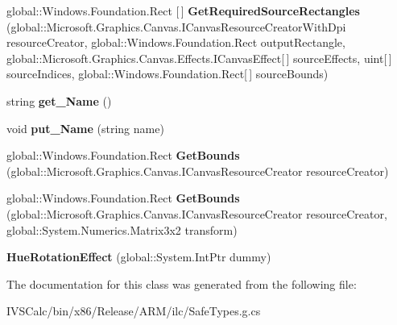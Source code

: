 \begin{DoxyCompactItemize}
\mbox{\label{class_microsoft_1_1_graphics_1_1_canvas_1_1_effects_1_1_hue_rotation_effect_ac2abf523127ccd95b9d02d46f71f9683}} 
global\+::\+Windows.\+Foundation.\+Rect \mbox{[}$\,$\mbox{]} {\bfseries Get\+Required\+Source\+Rectangles} (global\+::\+Microsoft.\+Graphics.\+Canvas.\+I\+Canvas\+Resource\+Creator\+With\+Dpi resource\+Creator, global\+::\+Windows.\+Foundation.\+Rect output\+Rectangle, global\+::\+Microsoft.\+Graphics.\+Canvas.\+Effects.\+I\+Canvas\+Effect\mbox{[}$\,$\mbox{]} source\+Effects, uint\mbox{[}$\,$\mbox{]} source\+Indices, global\+::\+Windows.\+Foundation.\+Rect\mbox{[}$\,$\mbox{]} source\+Bounds)
\item 
\mbox{\label{class_microsoft_1_1_graphics_1_1_canvas_1_1_effects_1_1_hue_rotation_effect_acc187d6e5e147dfe95acbc376249fd19}} 
string {\bfseries get\+\_\+\+Name} ()
\item 
\mbox{\label{class_microsoft_1_1_graphics_1_1_canvas_1_1_effects_1_1_hue_rotation_effect_a932c7355340271619fcaa575afcd4763}} 
void {\bfseries put\+\_\+\+Name} (string name)
\item 
\mbox{\label{class_microsoft_1_1_graphics_1_1_canvas_1_1_effects_1_1_hue_rotation_effect_a0bcc75008f31618574873729c8416da5}} 
global\+::\+Windows.\+Foundation.\+Rect {\bfseries Get\+Bounds} (global\+::\+Microsoft.\+Graphics.\+Canvas.\+I\+Canvas\+Resource\+Creator resource\+Creator)
\item 
\mbox{\label{class_microsoft_1_1_graphics_1_1_canvas_1_1_effects_1_1_hue_rotation_effect_a459bdeffdf2fdfe62606cf675b79b3b3}} 
global\+::\+Windows.\+Foundation.\+Rect {\bfseries Get\+Bounds} (global\+::\+Microsoft.\+Graphics.\+Canvas.\+I\+Canvas\+Resource\+Creator resource\+Creator, global\+::\+System.\+Numerics.\+Matrix3x2 transform)
\item 
\mbox{\label{class_microsoft_1_1_graphics_1_1_canvas_1_1_effects_1_1_hue_rotation_effect_aebbf1b3bfab285989a34fbe1db2363e2}} 
{\bfseries Hue\+Rotation\+Effect} (global\+::\+System.\+Int\+Ptr dummy)
\end{DoxyCompactItemize}


The documentation for this class was generated from the following file\+:\begin{DoxyCompactItemize}
\item 
I\+V\+S\+Calc/bin/x86/\+Release/\+A\+R\+M/ilc/Safe\+Types.\+g.\+cs\end{DoxyCompactItemize}
